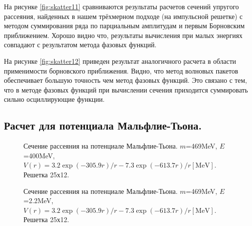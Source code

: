 \documentclass[a4paper,12pt]{article}
\begin{document}
	На рисунке \ref{fig:skatter11} сравниваются результаты расчетов сечений упругого рассеяния, найденных в нашем трёхмерном подходе (на импульсной решетке) с методом суммирования ряда по парциальным амплитудам и первым Борновским приближением. Хорошо видно что, результаты вычисления при малых энергиях совпадают с результатом метода фазовых функций. 
	
	На рисунке \ref{fig:skatter12} приведен результат аналогичного расчета в области применимости борновского приближения. Видно, что метод волновых пакетов обеспечивает большую точность чем метод фазовых функций. Это связано с тем, что в методе фазовых функций при вычислении сечения приходится суммировать сильно осциллирующие функции.


\subsection{Расчет для потенциала Мальфлие-Тьона.}
\begin{figure}[h!]
\caption{Сечение рассеяния на потенциале Мальфлие-Тьона. $m$=469MeV, $E$=400MeV, $V(r)=3.2\exp(-305.9r)/r-7.3\exp(-613.7r)/r [\text{MeV}]$. Решетка 25х12. }
\label{fig:skatter21}
\end{figure}

\begin{figure}[h!]
\caption{Сечение рассеяния на потенциале Мальфлие-Тьона. $m$=469MeV, $E$=2.2MeV, $V(r)=3.2\exp(-305.9r)/r-7.3\exp(-613.7r)/r [\text{MeV}]$. Решетка 25х12.}
\label{fig:skatter22}
\end{figure}
\end{document}
